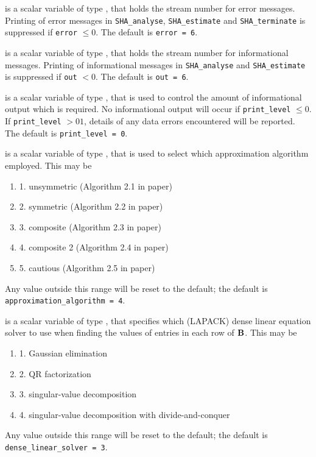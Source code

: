 \documentclass{galahad}
\newcommand{\packagename}{SHA}
\begin{document}
\begin{description}

 is a scalar variable of type \integer, that holds the
stream number for error messages. Printing of error messages in 
{\tt \packagename\_analyse},
{\tt \packagename\_estimate} 
and {\tt \packagename\_terminate} 
is suppressed if {\tt error} $\leq 0$.
The default is {\tt error = 6}.

 is a scalar variable of type \integer, that holds the
stream number for informational messages. Printing of informational messages in 
{\tt \packagename\_analyse} and {\tt \packagename\_estimate} 
is suppressed if {\tt out} $< 0$.
The default is {\tt out = 6}.

 is a scalar variable of type \integer, that is used
to control the amount of informational output which is required. No 
informational output will occur if {\tt print\_level} $\leq 0$. If 
{\tt print\_level} $> 01$, details of any data errors encountered 
will be reported.
The default is {\tt print\_level = 0}.

 is a scalar variable of type \integer, 
that is used to select which approximation algorithm employed. This may be
\begin{enumerate}
\item 1. unsymmetric (Algorithm 2.1 in paper)
\item 2. symmetric (Algorithm 2.2 in paper)
\item 3. composite (Algorithm 2.3 in paper)
\item 4. composite 2 (Algorithm 2.4 in paper)
\item 5. cautious (Algorithm 2.5 in paper)
\end{enumerate}
Any value outside this range will be reset to the default;
the default is {\tt approximation\_algorithm = 4}.

 is a scalar variable of type \integer, 
that specifies which (LAPACK) dense linear equation solver to use when finding
the values of entries in each row of ${\mathbf{B}}$. This may be
\begin{enumerate}
\item 1. Gaussian elimination
\item 2. QR factorization
\item 3. singular-value decomposition
\item 4. singular-value decomposition with divide-and-conquer
\end{enumerate}
Any value outside this range will be reset to the default;
the default is {\tt dense\_linear\_solver = 3}.


\end{description}
\end{document}
